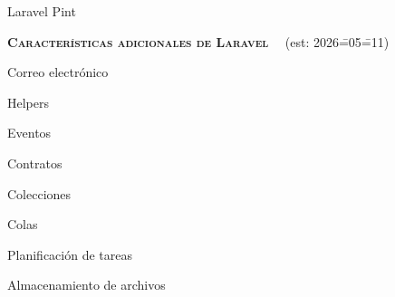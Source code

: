 \begin{longenum}
\begin{longenum}
\begin{longenum}
            \begin{longenum}
                \item Laravel Pint
            \end{longenum}
        \end{longenum}
    \end{longenum}
    \item \textbf{\textsc{Características adicionales de Laravel}} \ \opcional\ (est: 2026\==05\==11)
    \begin{longenum}
        \item Correo electrónico
        \item Helpers
        \item Eventos
        \item Contratos
        \item Colecciones
        \item Colas
        \item Planificación de tareas
        \item Almacenamiento de archivos
    \end{longenum}
\end{longenum}
